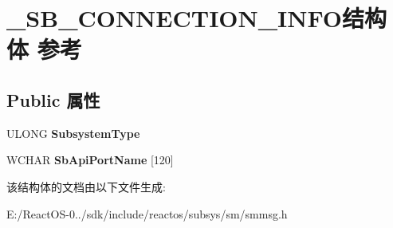 \hypertarget{struct___s_b___c_o_n_n_e_c_t_i_o_n___i_n_f_o}{}\section{\+\_\+\+S\+B\+\_\+\+C\+O\+N\+N\+E\+C\+T\+I\+O\+N\+\_\+\+I\+N\+F\+O结构体 参考}
\label{struct___s_b___c_o_n_n_e_c_t_i_o_n___i_n_f_o}
\subsection*{Public 属性}
\begin{DoxyCompactItemize}
\item 
\mbox{\label{struct___s_b___c_o_n_n_e_c_t_i_o_n___i_n_f_o_a5bdfbcc9874f2d7f285419a89ad722aa}} 
U\+L\+O\+NG {\bfseries Subsystem\+Type}
\item 
\mbox{\label{struct___s_b___c_o_n_n_e_c_t_i_o_n___i_n_f_o_a4ad46a07dfb39064a9376cb525f31418}} 
W\+C\+H\+AR {\bfseries Sb\+Api\+Port\+Name} \mbox{[}120\mbox{]}
\end{DoxyCompactItemize}


该结构体的文档由以下文件生成\+:\begin{DoxyCompactItemize}
\item 
E\+:/\+React\+O\+S-\/0../sdk/include/reactos/subsys/sm/smmsg.\+h\end{DoxyCompactItemize}
